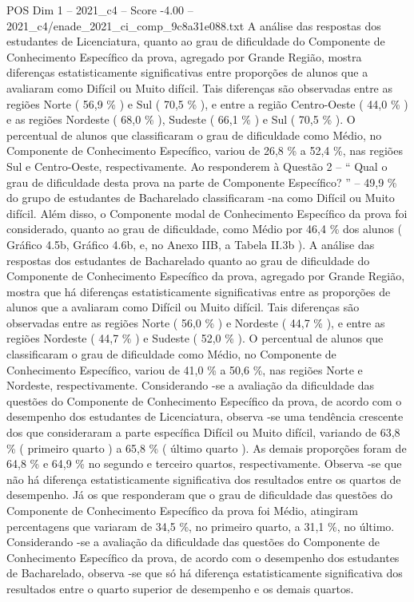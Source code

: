 \begin{textsample}{POS Dim 1 – 2021\_c4 – Score -4.00 – 2021\_c4/enade\_2021\_ci\_comp\_9c8a31e088.txt}
A análise das respostas dos estudantes de Licenciatura, quanto ao grau de dificuldade do Componente de Conhecimento Específico da prova, agregado por Grande Região, mostra diferenças estatisticamente significativas entre proporções de alunos que a avaliaram como Difícil ou Muito difícil.
Tais diferenças são observadas entre as regiões Norte ( 56,9 \% ) e Sul ( 70,5 \% ), e entre a região Centro-Oeste ( 44,0 \% ) e as regiões Nordeste ( 68,0 \% ), Sudeste ( 66,1 \% ) e Sul ( 70,5 \% ).
O percentual de alunos que classificaram o grau de dificuldade como Médio, no Componente de Conhecimento Específico, variou de 26,8 \% a 52,4 \%, nas regiões Sul e Centro-Oeste, respectivamente.
Ao responderem à Questão 2 – “ Qual o grau de dificuldade desta prova na parte de Componente Específico? ” – 49,9 \% do grupo de estudantes de Bacharelado classificaram -na como Difícil ou Muito difícil.
Além disso, o Componente modal de Conhecimento Específico da prova foi considerado, quanto ao grau de dificuldade, como Médio por 46,4 \% dos alunos ( Gráfico 4.5b, Gráfico 4.6b, e, no Anexo IIB, a Tabela II.3b ).
A análise das respostas dos estudantes de Bacharelado quanto ao grau de dificuldade do Componente de Conhecimento Específico da prova, agregado por Grande Região, mostra que há diferenças estatisticamente significativas entre as proporções de alunos que a avaliaram como Difícil ou Muito difícil.
Tais diferenças são observadas entre as regiões Norte ( 56,0 \% ) e Nordeste ( 44,7 \% ), e entre as regiões Nordeste ( 44,7 \% ) e Sudeste ( 52,0 \% ).
O percentual de alunos que classificaram o grau de dificuldade como Médio, no Componente de Conhecimento Específico, variou de 41,0 \% a 50,6 \%, nas regiões Norte e Nordeste, respectivamente.
Considerando -se a avaliação da dificuldade das questões do Componente de Conhecimento Específico da prova, de acordo com o desempenho dos estudantes de Licenciatura, observa -se uma tendência crescente dos que consideraram a parte específica Difícil ou Muito difícil, variando de 63,8 \% ( primeiro quarto ) a 65,8 \% ( último quarto ).
As demais proporções foram de 64,8 \% e 64,9 \% no segundo e terceiro quartos, respectivamente.
Observa -se que não há diferença estatisticamente significativa dos resultados entre os quartos de desempenho.
Já os que responderam que o grau de dificuldade das questões do Componente de Conhecimento Específico da prova foi Médio, atingiram percentagens que variaram de 34,5 \%, no primeiro quarto, a 31,1 \%, no último.
Considerando -se a avaliação da dificuldade das questões do Componente de Conhecimento Específico da prova, de acordo com o desempenho dos estudantes de Bacharelado, observa -se que só há diferença estatisticamente significativa dos resultados entre o quarto superior de desempenho e os demais quartos.

\end{textsample}
